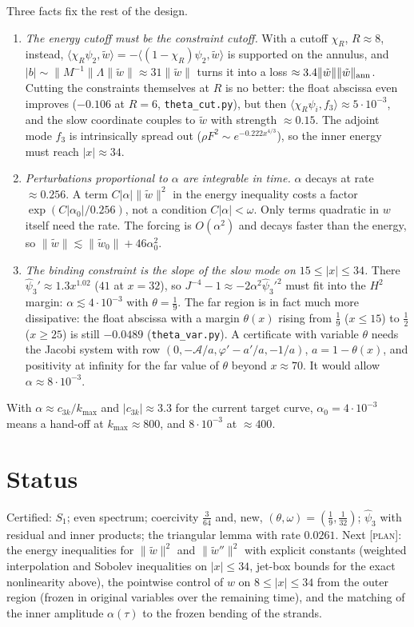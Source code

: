 \documentclass[11pt]{amsart}
\theoremstyle{remark}
\newcommand{\ip}[2]{\langle #1,#2\rangle}
\newcommand{\lab}[1]{\textup{\textsc{[#1]}}}
\begin{document}
Three facts fix the rest of the design.
\begin{enumerate}
\item \emph{The energy cutoff must be the constraint cutoff.} With a cutoff $\chi_R$, $R\approx8$, instead, $\ip{\chi_R\psi_2}{\tilde w}=-\ip{(1-\chi_R)\psi_2}{\tilde w}$ is supported on the annulus, and $|b|\sim\|M^{-1}\|\Lambda\|\tilde w\|\approx31\|\tilde w\|$ turns it into a loss $\approx3.4\|\tilde w\|\|\tilde w\|_{\rm ann}$. Cutting the constraints themselves at $R$ is no better: the float abscissa even improves ($-0.106$ at $R=6$, \texttt{theta\_cut.py}), but then $\ip{\chi_R\psi_i}{f_3}\approx5\cdot10^{-3}$, and the slow coordinate couples to $\tilde w$ with strength $\approx0.15$. The adjoint mode $f_3$ is intrinsically spread out ($\rho F^2\sim e^{-0.222x^{4/3}}$), so the inner energy must reach $|x|\approx34$.
\item \emph{Perturbations proportional to $\alpha$ are integrable in time.} $\alpha$ decays at rate $\approx0.256$. A term $C|\alpha|\|\tilde w\|^2$ in the energy inequality costs a factor $\exp(C|\alpha_0|/0.256)$, not a condition $C|\alpha|<\omega$. Only terms quadratic in $w$ itself need the rate. The forcing is $O(\alpha^2)$ and decays faster than the energy, so $\|\tilde w\|\lesssim\|\tilde w_0\|+46\alpha_0^2$.
\item \emph{The binding constraint is the slope of the slow mode on $15\le|x|\le34$.} There $\hat\psi_3'\approx1.3x^{1.02}$ ($41$ at $x=32$), so $J^{-4}-1\approx-2\alpha^2\hat\psi_3'^2$ must fit into the $H^2$ margin: $\alpha\lesssim4\cdot10^{-3}$ with $\theta=\frac19$. The far region is in fact much more dissipative: the float abscissa with a margin $\theta(x)$ rising from $\frac19$ ($x\le15$) to $\frac12$ ($x\ge25$) is still $-0.0489$ (\texttt{theta\_var.py}). A certificate with variable $\theta$ needs the Jacobi system with row $(0,-\mathcal A/a,\varphi'-a'/a,-1/a)$, $a=1-\theta(x)$, and positivity at infinity for the far value of $\theta$ beyond $x\approx70$. It would allow $\alpha\approx8\cdot10^{-3}$.
\end{enumerate}
With $\alpha\approx c_{3k}/k_{\max}$ and $|c_{3k}|\approx3.3$ for the current target curve, $\alpha_0=4\cdot10^{-3}$ means a hand-off at $k_{\max}\approx800$, and $8\cdot10^{-3}$ at $\approx400$.

\section{Status}
Certified: $S_1$; even spectrum; coercivity $\frac3{64}$ and, new, $(\theta,\omega)=(\frac19,\frac1{32})$; $\hat\psi_3$ with residual and inner products; the triangular lemma with rate $0.0261$. Next \lab{plan}: the energy inequalities for $\|\tilde w\|^2$ and $\|\tilde w''\|^2$ with explicit constants (weighted interpolation and Sobolev inequalities on $|x|\le34$, jet-box bounds for the exact nonlinearity above), the pointwise control of $w$ on $8\le|x|\le34$ from the outer region (frozen in original variables over the remaining time), and the matching of the inner amplitude $\alpha(\tau)$ to the frozen bending of the strands.
\end{document}
